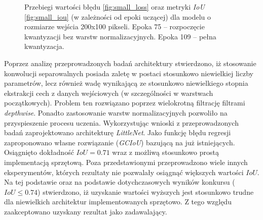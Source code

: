 \begin{figure}
    \caption{Przebiegi wartości błędu \ref{fig:small_loss} oraz metryki \emph{IoU} \ref{fig:small_iou} (w zależności od epoki uczącej) dla modelu o rozmiarze wejścia 200x100 pikseli.
    Epoka 75 -- rozpoczęcie kwantyzacji bez warstw normalizacyjnych. Epoka 109 -- pełna kwantyzacja.}
    \label{fig:three_step_train}
\end{figure}


Poprzez analizę przeprowadzonych badań architektury stwierdzono, iż stosowanie konwolucji separowalnych posiada zaletę w postaci stosunkowo niewielkiej liczby parametrów, lecz również wadę wynikającą ze stosunkowo niewielkiego stopnia ekstrakcji cech z danych wejściowych (w szczególności w warstwach początkowych). 
Problem ten rozwiązano poprzez wielokrotną filtrację filtrami \emph{depthwise}.
Ponadto zastosowanie warstw normalizacyjnych pozwoliło na przyspieszenie procesu uczenia.
Wykorzystując wnioski z przeprowadzonych badań zaprojektowano architekturę \emph{LittleNet}.
Jako funkcję błędu regresji zaproponowano własne rozwiązanie (\emph{GCIoU}) bazującą na już istniejących.
Osiągnięto dokładność $IoU = 0.71$ wraz z możliwą stosunkowo prostą implementacją sprzętową.
Poza przedstawionymi przeprowadzono wiele innych eksperymentów, 
których rezultaty nie pozwalały osiągnąć większych wartości $IoU$.
Na tej podstawie oraz na podstawie dotychczasowych wyników konkursu ($IoU \leq 0.74$) stwierdzono, 
iż uzyskanie wartości wyższych jest stosunkowo trudne dla niewielkich architektur implementowanych sprzętowo.
Z tego względu zaakceptowano uzyskany rezultat jako zadawalający.